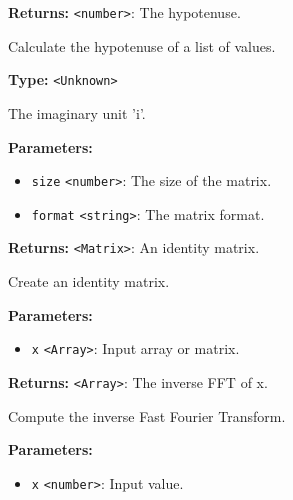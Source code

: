\documentclass[12pt,a4paper]{article}
\begin{document}
\noindent \textbf{Returns:} \texttt{<number>}: The hypotenuse.

\noindent Calculate the hypotenuse of a list of values.

\vspace{5mm}
\noindent {}\vspace{4mm}


\noindent \textbf{Type:} \texttt{<Unknown>}

\noindent The imaginary unit 'i'.

\vspace{5mm}
\noindent {}


\noindent \textbf{Parameters:}
\begin{itemize}
  \item \texttt{size} \texttt{<number>}: The size of the matrix.
  \item \texttt{format} \texttt{<string>}: The matrix format.
\end{itemize}

\noindent \textbf{Returns:} \texttt{<Matrix>}: An identity matrix.

\noindent Create an identity matrix.

\vspace{5mm}
\noindent {}


\noindent \textbf{Parameters:}
\begin{itemize}
  \item \texttt{x} \texttt{<Array>}: Input array or matrix.
\end{itemize}

\noindent \textbf{Returns:} \texttt{<Array>}: The inverse FFT of x.

\noindent Compute the inverse Fast Fourier Transform.

\vspace{5mm}
\noindent {}


\noindent \textbf{Parameters:}
\begin{itemize}
  \item \texttt{x} \texttt{<number>}: Input value.
\end{itemize}
\end{document}
